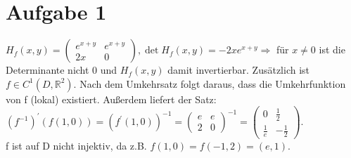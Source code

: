 \documentclass{scrartcl}
\begin{document}
\section*{Aufgabe 1}

$H_f(x,y)=\begin{pmatrix}e^{x+y}&e^{x+y}\\2x&0\end{pmatrix},\det H_f(x,y)=-2xe^{x+y}\Rightarrow$ f\"ur $x\neq 0$ ist
die Determinante nicht 0 und $H_f(x,y)$ damit invertierbar. Zus\"atzlich ist $f\in C^1(D,\mathbb{R}^2)$. Nach dem Umkehrsatz folgt
daraus, dass die Umkehrfunktion von f (lokal) existiert. Au\ss{}erdem liefert der Satz:\\
$(f^{-1})^\prime(f(1,0))=(f^\prime(1,0))^{-1}=\begin{pmatrix}e&e\\2&0\end{pmatrix}^{-1}=
\begin{pmatrix}0&\frac 1 2\\\frac 1 e&-\frac  1 2\end{pmatrix}$.\\
f ist auf D nicht injektiv, da z.B. $f(1,0)=f(-1,2)=(e,1)$.
\end{document}
